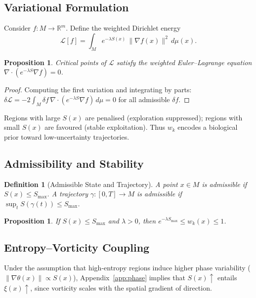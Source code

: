 \documentclass[12pt, a4paper]{article}
\newtheorem{definition}[theorem]{Definition}
\newtheorem{proposition}[theorem]{Proposition}
\theoremstyle{remark}
\theoremstyle{definition}
\begin{document}
\subsection{Variational Formulation}

Consider $f \colon M \to \mathbb{R}^m$.  Define the weighted Dirichlet energy
\[
\mathcal{L}[f]
= \int_M e^{-\lambda S(x)}\,\|\nabla f(x)\|^2\,d\mu(x).
\]

\begin{proposition}
Critical points of $\mathcal{L}$ satisfy the weighted Euler--Lagrange equation
$\nabla\cdot(e^{-\lambda S}\nabla f) = 0$.
\end{proposition}

\begin{proof}
Computing the first variation and integrating by parts:
$\delta\mathcal{L} = -2\int_M \delta f\,\nabla\cdot(e^{-\lambda S}\nabla f)\,d\mu = 0$
for all admissible $\delta f$.
\end{proof}

Regions with large $S(x)$ are penalised (exploration suppressed); regions with small
$S(x)$ are favoured (stable exploitation).  Thus $w_k$ encodes a biological prior toward
low-uncertainty trajectories.

\subsection{Admissibility and Stability}

\begin{definition}[Admissible State and Trajectory]
A point $x \in M$ is admissible if $S(x) \le S_{\max}$.  A trajectory $\gamma\colon[0,T]\to M$
is admissible if $\sup_{t} S(\gamma(t)) \le S_{\max}$.
\end{definition}

\begin{proposition}
If $S(x) \le S_{\max}$ and $\lambda > 0$, then $e^{-\lambda S_{\max}} \le w_k(x) \le 1$.
\end{proposition}

\subsection{Entropy--Vorticity Coupling}

Under the assumption that high-entropy regions induce higher phase variability
($\|\nabla\theta(x)\| \propto S(x)$), Appendix~\ref{app:phase} implies that
$S(x) \uparrow$ entails $\xi(x) \uparrow$, since vorticity scales with the spatial
gradient of direction.
\end{document}
